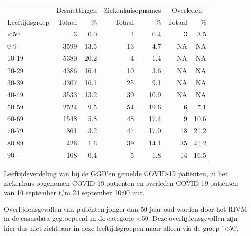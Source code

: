 \documentclass[
  english,
  man,floatsintext]{apa6}
\begin{document}
\begin{table}
\centering\begingroup\fontsize{11}{13}\selectfont

\begin{threeparttable}
\begin{tabular}{lrrrrrr}
\toprule
\multicolumn{1}{c}{ } & \multicolumn{2}{c}{Besmettingen} & \multicolumn{2}{c}{Ziekenhuisopnames} & \multicolumn{2}{c}{Overleden} \\
\cmidrule(l{3pt}r{3pt}){2-3} \cmidrule(l{3pt}r{3pt}){4-5} \cmidrule(l{3pt}r{3pt}){6-7}
Leeftijdsgroep & Totaal & \% & Totaal & \% & Totaal & \%\\
\midrule
<50 & 3 & 0.0 & 1 & 0.4 & 3 & 3.5\\
0-9 & 3599 & 13.5 & 13 & 4.7 & NA & NA\\
10-19 & 5380 & 20.2 & 4 & 1.4 & NA & NA\\
20-29 & 4386 & 16.4 & 10 & 3.6 & NA & NA\\
30-39 & 4307 & 16.1 & 25 & 9.1 & NA & NA\\
40-49 & 3533 & 13.2 & 30 & 10.9 & NA & NA\\
50-59 & 2524 & 9.5 & 54 & 19.6 & 6 & 7.1\\
60-69 & 1548 & 5.8 & 48 & 17.4 & 9 & 10.6\\
70-79 & 861 & 3.2 & 47 & 17.0 & 18 & 21.2\\
80-89 & 426 & 1.6 & 39 & 14.1 & 35 & 41.2\\
90+ & 108 & 0.4 & 5 & 1.8 & 14 & 16.5\\
\bottomrule
\end{tabular}
\begin{tablenotes}
\item[1] Leeftijdsverdeling van bij de GGD’en gemelde COVID-19 patiënten, in het ziekenhuis opgenomen COVID-19 patiënten en overleden COVID-19 patiënten van 10 september t/m 24 september 10:00 uur.
\item[2] Overlijdensgevallen van patiënten jonger dan 50 jaar oud worden door het RIVM in de casusdata gegroepeerd in de categorie <50. Deze overlijdensgevallen zijn hier dus niet zichtbaar in deze leeftijdsgroepen maar alleen via de groep '<50'.
\end{tablenotes}
\end{threeparttable}
\endgroup{}
\end{table}

\newpage
\end{document}
